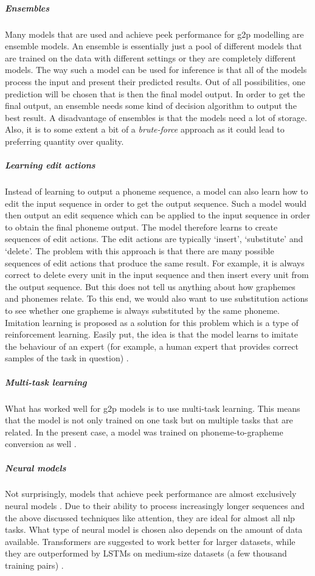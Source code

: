 \subparagraph{Ensembles}
Many models that are used and achieve peek performance for \ac{g2p} modelling are ensemble models. An ensemble is essentially just a pool of different models that are trained on the data with different settings or they are completely different models. The way such a model can be used for inference is that all of the models process the input and present their predicted results. Out of all possibilities, one prediction will be chosen that is then the final model output. In order to get the final output, an ensemble needs some kind of decision algorithm to output the best result. A disadvantage of ensembles is that the models need a lot of storage. Also, it is to some extent a bit of a \textit{brute-force} approach as it could lead to preferring quantity over quality. 

\subparagraph{Learning edit actions}
Instead of learning to output a phoneme sequence, a model can also learn how to edit the input sequence in order to get the output sequence. Such a model would then output an edit sequence which can be applied to the input sequence in order to obtain the final phoneme output. The model therefore learns to create sequences of edit actions. The edit actions are typically `insert', `substitute' and `delete'. The problem with this approach is that there are many possible sequences of edit actions that produce the same result. For example, it is always correct to delete every unit in the input sequence and then insert every unit from the output sequence. But this does not tell us anything about how graphemes and phonemes relate. To this end, we would also want to use substitution actions to see whether one grapheme is always substituted by the same phoneme. Imitation learning is proposed as a solution for this problem which is a type of reinforcement learning. Easily put, the idea is that the model learns to imitate the behaviour of an expert (for example, a human expert that provides correct samples of the task in question) \citep{Ai.2019}. 

\subparagraph{Multi-task learning}
What has worked well for \ac{g2p} models is to use multi-task learning. This means that the model is not only trained on one task but on multiple tasks that are related. In the present case, a model was trained on phoneme-to-grapheme conversion as well \citep{gorman-etal-2020-sigmorphon}.

\subparagraph{Neural models}
Not surprisingly, models that achieve peek performance are almost exclusively neural models \citep{gorman-etal-2020-sigmorphon}. Due to their ability to process increasingly longer sequences and the above discussed techniques like attention, they are ideal for almost all \ac{nlp} tasks. What type of neural model is chosen also depends on the amount of data available. Transformers are suggested to work better for larger datasets, while they are outperformed by LSTMs on medium-size datasets (a few thousand training pairs) \citep{gorman-etal-2020-sigmorphon}.

